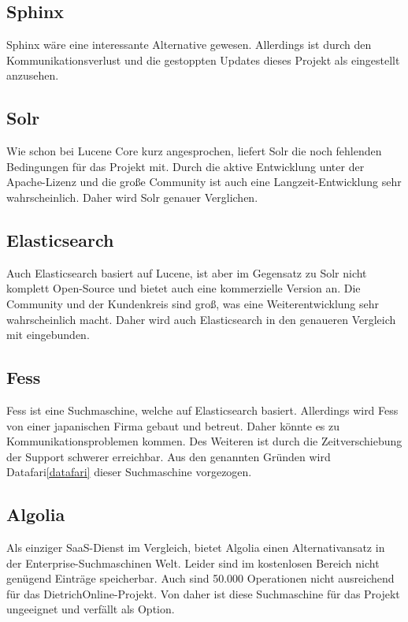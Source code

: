 \subsection{Sphinx}

Sphinx wäre eine interessante Alternative gewesen. Allerdings ist durch den Kommunikationsverlust und die gestoppten Updates dieses Projekt als eingestellt anzusehen. \cite{SphinxTechnologiesInc.2019}

\subsection{Solr}

Wie schon bei Lucene Core kurz angesprochen, liefert Solr die noch fehlenden Bedingungen für das Projekt mit. Durch die aktive Entwicklung unter der Apache-Lizenz und die große Community ist auch eine Langzeit-Entwicklung sehr wahrscheinlich. Daher wird Solr genauer Verglichen. \cite{TheApacheSoftwareFoundation.2019}

\subsection{Elasticsearch}

Auch Elasticsearch basiert auf Lucene, ist aber im Gegensatz zu Solr nicht komplett Open-Source und bietet auch eine kommerzielle Version an. Die Community und der Kundenkreis sind groß, was eine Weiterentwicklung sehr wahrscheinlich macht. Daher wird auch Elasticsearch in den genaueren Vergleich mit eingebunden. \cite{Elasticsearch.2019}

\subsection{Fess}

Fess ist eine Suchmaschine, welche auf Elasticsearch basiert. Allerdings wird Fess von einer japanischen Firma gebaut und betreut. Daher könnte es zu Kommunikationsproblemen kommen. Des Weiteren ist durch die Zeitverschiebung der Support schwerer erreichbar. Aus den genannten Gründen wird Datafari\ref{datafari} dieser Suchmaschine vorgezogen. \cite{CodeLibs.2019}

\subsection{Algolia}

Als einziger SaaS-Dienst im Vergleich, bietet Algolia einen Alternativansatz in der Enterprise-Suchmaschinen Welt. Leider sind im kostenlosen Bereich nicht genügend Einträge speicherbar. Auch sind 50.000 Operationen nicht ausreichend für das DietrichOnline-Projekt. Von daher ist diese Suchmaschine für das Projekt ungeeignet und verfällt als Option. \cite{Algolia.2019}

